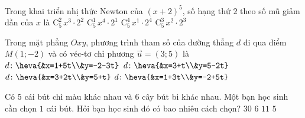 	\begin{ex}%
		Trong khai triển nhị thức Newton của $(x+2)^5$, số hạng thứ $2$ theo số mũ giảm dần của $x$ là
		\choice
		{$\mathrm{C}_5^2\,x^3 \cdot 2^2$}
		{\True $\mathrm{C}_5^1\,x^4 \cdot 2^1$}
		{$\mathrm{C}_5^4\,x^1 \cdot 2^4$}
		{$\mathrm{C}_5^3\,x^2 \cdot 2^3$}
	\end{ex}

	\begin{ex}%
		Trong mặt phẳng $Oxy$, phương trình tham số của đường thẳng $d$ đi qua điểm $M(1;-2)$ và có véc-tơ chỉ phương $\vec{u}=(3;5)$ là
		\choice
		{$d\colon\heva{&x=1+5t\\&y=-2-3t}$}
		{$d\colon\heva{&x=3+t\\&y=5-2t}$}
		{$d\colon\heva{&x=3+2t\\&y=5+t}$}
		{\True $d\colon\heva{&x=1+3t\\&y=-2+5t}$}
	\end{ex}

	\begin{ex}%
		Có $5$ cái bút chì màu khác nhau và $6$ cây bút bi khác nhau. Một bạn học sinh cần chọn $1$ cái bút. Hỏi bạn học sinh đó có bao nhiêu cách chọn?
		\choice
		{$30$}
		{$6$}
		{\True $11$}
		{$5$}
	\end{ex}


